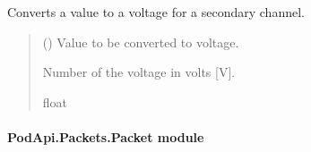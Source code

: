 \documentclass[letterpaper,10pt,english]{sphinxmanual}
\begin{document}
\begin{fulllineitems}
\begin{fulllineitems}
\label{\detokenize{PodApi.Packets:PodApi.Packets.Binary5.PacketBinary5._Voltage_SecondaryChannels}}
\pysigstartsignatures
{}
\pysigstopsignatures
\sphinxAtStartPar
Converts a value to a voltage for a secondary channel.
\begin{quote}\begin{description}
\sphinxAtStartPar
{} () \textendash{} Value to be converted to voltage.

\sphinxAtStartPar
Number of the voltage in volts {[}V{]}.

\sphinxAtStartPar
float

\end{description}\end{quote}

\end{fulllineitems}


\end{fulllineitems}



\paragraph{PodApi.Packets.Packet module}
\label{\detokenize{PodApi.Packets:module-PodApi.Packets.Packet}}\label{\detokenize{PodApi.Packets:podapi-packets-packet-module}}
\end{document}
